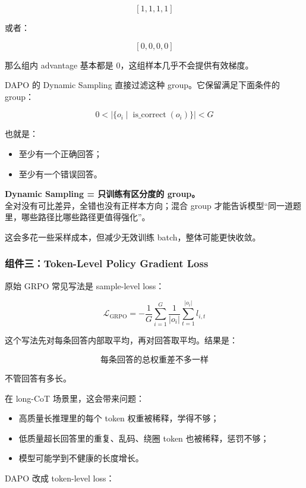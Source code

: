 \[
[1,1,1,1]
\]

或者：

\[
[0,0,0,0]
\]

那么组内 advantage 基本都是 $0$，这组样本几乎不会提供有效梯度。

DAPO 的 Dynamic Sampling 直接过滤这种 group。它保留满足下面条件的 group：

\[
0
<
\left|
\{o_i \mid \operatorname{is\_correct}(o_i)\}
\right|
<
G
\]

也就是：

\begin{itemize}[leftmargin=1.5em]
  \item 至少有一个正确回答；
  \item 至少有一个错误回答。
\end{itemize}

\begin{summarybox}
\textbf{Dynamic Sampling = 只训练有区分度的 group。}\\
全对没有可比差异，全错也没有正样本方向；混合 group 才能告诉模型“同一道题里，哪些路径比哪些路径更值得强化”。
\end{summarybox}

这会多花一些采样成本，但减少无效训练 batch，整体可能更快收敛。

\subsubsection{组件三：Token-Level Policy Gradient Loss}

原始 GRPO 常见写法是 sample-level loss：

\[
\mathcal{L}_\text{GRPO}
=
-
\frac{1}{G}
\sum_{i=1}^{G}
\frac{1}{|o_i|}
\sum_{t=1}^{|o_i|}
l_{i,t}
\]

这个写法先对每条回答内部取平均，再对回答取平均。结果是：

\[
\text{每条回答的总权重差不多一样}
\]

不管回答有多长。

在 long-CoT 场景里，这会带来问题：

\begin{itemize}[leftmargin=1.5em]
  \item 高质量长推理里的每个 token 权重被稀释，学得不够；
  \item 低质量超长回答里的重复、乱码、绕圈 token 也被稀释，惩罚不够；
  \item 模型可能学到不健康的长度增长。
\end{itemize}

DAPO 改成 token-level loss：

